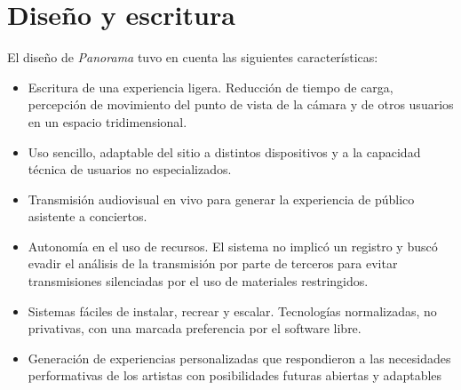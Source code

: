 
\section*{Diseño y escritura} %

\color{BlueGreen}


\color{black}

El diseño de \textit{Panorama} tuvo en cuenta las siguientes características:

\begin{itemize}
\item Escritura de una experiencia ligera. Reducción de tiempo de carga, percepción de movimiento del punto de vista de la cámara y de otros usuarios en un espacio tridimensional. 
\item Uso sencillo, adaptable del sitio a distintos dispositivos y a la capacidad técnica de usuarios no especializados. 
\item Transmisión audiovisual en vivo para generar la experiencia de público asistente a conciertos. 
\item Autonomía en el uso de recursos. El sistema no implicó un registro y buscó evadir el análisis de la transmisión por parte de terceros para evitar transmisiones silenciadas por el uso de materiales restringidos. 
\item Sistemas fáciles de instalar, recrear y escalar. 
Tecnologías normalizadas, no privativas, con una marcada preferencia por el software libre. 
\item Generación de experiencias personalizadas que respondieron a las necesidades performativas de los artistas con posibilidades futuras abiertas y adaptables
 
\end{itemize}

